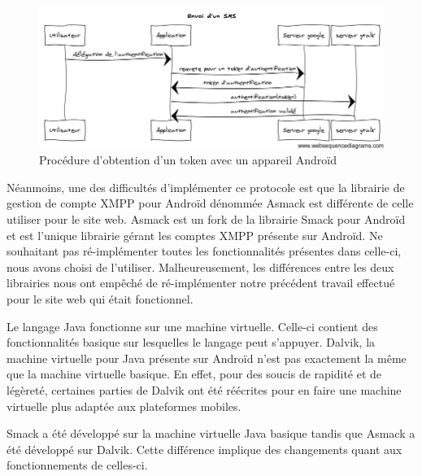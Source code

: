  

\begin{figure}[!h]
  \center
  \includegraphics[width=15cm]{img/obtention-token-avec-android.png}
  \caption{Procédure d'obtention d'un token avec un appareil Androïd}
  \label{obtention-token-avec-android}
\end{figure}

Néanmoins, une des difficultés d'implémenter ce protocole est que la librairie de gestion de compte
XMPP pour Androïd dénommée Asmack est différente de celle utiliser pour le site web. Asmack est un fork 
de la librairie Smack pour Androïd et est l'unique librairie gérant les comptes XMPP présente sur
Androïd. Ne souhaitant pas ré-implémenter toutes les fonctionnalités présentes dans celle-ci, nous avons
choisi de l'utiliser. Malheureusement, les différences entre les deux librairies nous ont empêché de 
ré-implémenter notre précédent travail effectué pour le site web qui était fonctionnel. 

Le langage Java fonctionne sur une machine virtuelle. Celle-ci contient des fonctionnalités basique sur
lesquelles le langage peut s'appuyer. Dalvik, la machine virtuelle pour Java présente sur Androïd n'est 
pas exactement la même que la machine virtuelle basique. En effet, pour des soucis de rapidité et de 
légèreté, certaines parties de Dalvik ont été réécrites pour en faire une machine virtuelle plus adaptée
aux plateformes mobiles.

Smack a été développé sur la machine virtuelle Java basique tandis que Asmack a été développé sur Dalvik.
Cette différence implique des changements quant aux fonctionnements de celles-ci.

